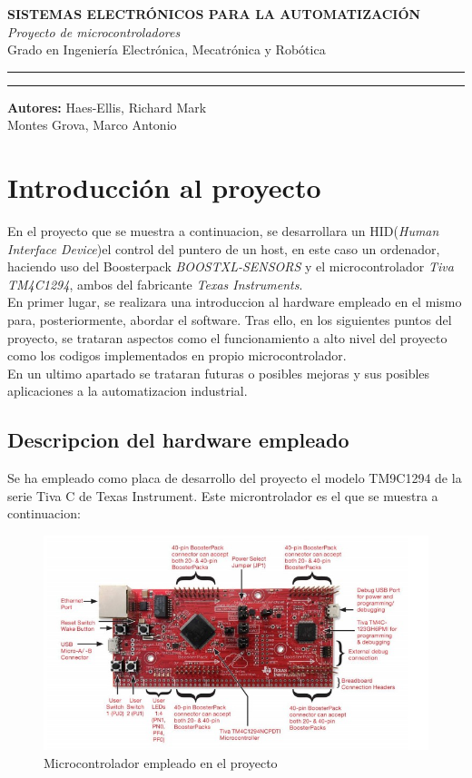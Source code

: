 \documentclass[a4paper,twoside]{article}
\begin{document}
\begin{titlepage}
 \centering
 \Huge{\textbf{SISTEMAS ELECTRÓNICOS PARA LA AUTOMATIZACIÓN}} \\
 \Huge{\textit{Proyecto de microcontroladores}}\\

 \vspace{1cm}
 \LARGE{Grado en Ingeniería Electrónica, Mecatrónica y Robótica}\\
 \rule{\textwidth}{0.1mm}

 \vspace{2cm}
 \rule{\textwidth}{0.1mm}
 \Large{\textbf{Autores:} Haes-Ellis, Richard Mark\\
 Montes Grova, Marco Antonio}
\end{titlepage}
\tableofcontents
\newpage

\section{Introducción al proyecto}
En el proyecto que se muestra a continuacion, se desarrollara un HID(\textit{Human Interface Device})el control del puntero de un host, en este caso un ordenador, haciendo  uso del Boosterpack \textit{BOOSTXL-SENSORS} y el microcontrolador \textit{Tiva TM4C1294}, ambos del fabricante \textit{Texas Instruments}.\\
En primer lugar, se realizara una introduccion al hardware empleado en el mismo para, posteriormente, abordar el software. Tras ello, en los siguientes puntos del proyecto, se trataran aspectos como el funcionamiento a alto nivel del proyecto como los codigos implementados en propio microcontrolador.\\
En un ultimo apartado se trataran futuras o posibles mejoras y sus posibles aplicaciones a la automatizacion industrial.
\subsection{Descripcion del hardware empleado}
Se ha empleado como placa de desarrollo del proyecto el modelo TM9C1294 de la serie Tiva C de Texas Instrument. Este microntrolador es el que se muestra a continuacion: \\
 \begin{figure}[h!]
	\centering
	\includegraphics[width=.7\textwidth]{../images/tiva_tm4c1294}
  \caption{Microcontrolador empleado en el proyecto}
\end{figure}
\end{document}
